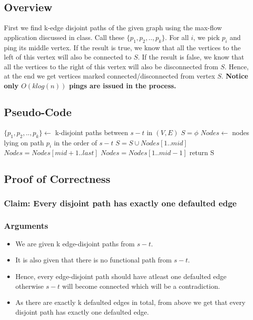 \documentclass{article}
\begin{document}
\subsection{Overview}
First we find k-edge disjoint paths of the given graph using the max-flow application discussed in class. Call these $\{p_1, p_2, .., p_k\}$. For all $i$, we pick $p_i$ and ping its middle vertex. If the result is true, we know that all the vertices to the left of this vertex will also be connected to $S$. If the result is false, we know that all the vertices to the right of this vertex will also be disconnected from $S$. Hence, at the end we get vertices marked connected/disconnected from vertex $S$. {\bf Notice only $O(klog(n))$ pings are issued in the process.}     

\subsection{Pseudo-Code}
\begin{algorithmic}[1]
  \State $\{p_1,p_2,..,p_k\} \gets$ k-disjoint paths between $s-t$ in $(V,E)$
  \State $S = \phi$
  \State $Nodes \gets$ nodes lying on path $p_i$ in the order of $s-t$
  \State $ S = S \cup Nodes[1..mid]$
  \State $ Nodes = Nodes[mid+1..last]$
  \Else
  \State $ Nodes = Nodes[1..mid-1]$
  \EndIf
  \EndWhile
  \EndFor
  \State return S
  \EndProcedure
\end{algorithmic} 
\subsection{Proof of Correctness}
\subsubsection{Claim: Every disjoint path has exactly one defaulted edge}
\subsubsection{Arguments}
\begin{itemize}
\item We are given k edge-disjoint paths from $s-t$.
\item It is also given that there is no functional path from $s-t$.
\item Hence, every edge-disjoint path should have atleast one defaulted edge otherwise $s-t$ will become connected which will be a contradiction.
\item As there are exactly k defaulted edges in total, from above we get that every disjoint path has exactly one defaulted edge.
\end{itemize} 
\end{document}
